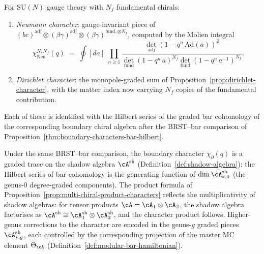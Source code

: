 \begin{example}
\label{ex:gauge-matter-characters}
For $\mathrm{SU}(N)$ gauge theory with $N_f$ fundamental chirals:
\begin{enumerate}[label=\textup{(\roman*)},nosep]
\item \emph{Neumann character}: gauge-invariant piece of
 $(bc)^{\mathrm{adj}} \otimes (\beta\gamma)^{\mathrm{adj}} \otimes
 (\beta\gamma)^{\mathrm{fund},\otimes N_f}$, computed by the Molien
 integral
 \[
 \chi_{\mathrm{Neu}}^{N,N_f}(q)
 \;=\;
 \oint [da]\;
 \prod_{n \geq 1}
 \frac{\det_{\mathrm{adj}}(1 - q^n\,\mathrm{Ad}(a))^2}
 {\det_{\mathrm{fund}}(1 - q^n\,a)^{N_f}
 \det_{\mathrm{fund}}(1 - q^n\,a^{-1})^{N_f}}.
 \]
\item \emph{Dirichlet character}: the monopole-graded sum of
 Proposition~\ref{prop:dirichlet-character}, with the matter index
 now carrying $N_f$ copies of the fundamental contribution.
\end{enumerate}
Each of these is identified with the Hilbert series of the graded bar
cohomology of the corresponding boundary chiral algebra after the
BRST--bar comparison of
Proposition~\ref{thm:boundary-characters-bar-hilbert}.
\end{example}

\begin{remark}
\label{rem:characters-shadow-projection}
Under the same BRST--bar comparison, the boundary character
$\chi_\partial(q)$ is a graded trace on the shadow algebra
$\cA^{\mathrm{sh}}$
(Definition~\ref{def:shadow-algebra}): the Hilbert series
of bar cohomology is the generating function of
$\dim \cA^{\mathrm{sh}}_{*,0}$ (the genus-$0$ degree-graded
components). The product formula of
Proposition~\ref{prop:multi-chiral-product-characters} reflects
the multiplicativity of shadow algebras: for tensor products
$\cA = \cA_1 \otimes \cA_2$, the shadow algebra factorises as
$\cA^{\mathrm{sh}} \cong \cA_1^{\mathrm{sh}} \otimes
\cA_2^{\mathrm{sh}}$, and the character product follows.
Higher-genus corrections to the character are encoded in the
genus-$g$ graded pieces $\cA^{\mathrm{sh}}_{*,g}$, each
controlled by the corresponding projection of the master MC
element $\Theta_{\cA}$
(Definition~\ref{def:modular-bar-hamiltonian}).
\end{remark}

